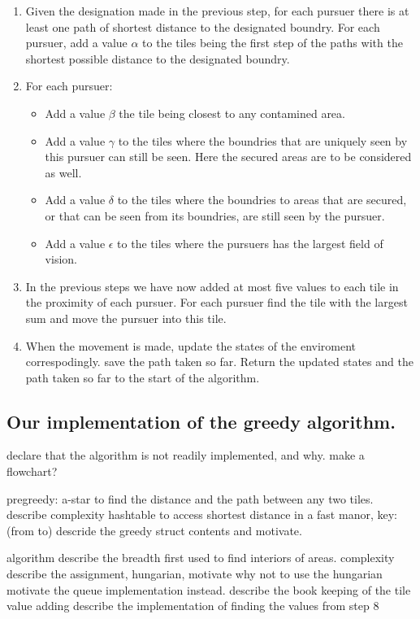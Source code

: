 \begin{enumerate}
\item{} Given the designation made in the previous step, for each pursuer there is at least one path of shortest distance to the designated boundry. For each pursuer,  add a value $\alpha$ to the tiles being the first step of the paths with the shortest possible distance to the designated boundry.
\item{} For each pursuer:
\begin{itemize}
\item{} Add a value $\beta$ the tile being closest to any contamined area. 
\item{} Add a value $\gamma$ to the tiles where the boundries that are uniquely seen by this pursuer can still be seen. Here the secured areas are to be considered as well.
\item{} Add a value $\delta$ to the tiles where the boundries to areas that are secured, or that can be seen from its boundries, are still seen by the pursuer.
\item{} Add a value $\epsilon$ to the tiles where the pursuers has the largest field of vision.
\end{itemize}
\item{} In the previous steps we have now added at most five values to each tile in the proximity of each pursuer. For each pursuer find the tile with the largest sum and move the pursuer into this tile.
\item{} When the movement is made, update the states of the enviroment correspodingly. save the path taken so far. Return the updated states and the path taken so far to the start of the algorithm. 
\end{enumerate}
\subsection{Our implementation of the greedy algorithm.}
declare that the algorithm is not readily implemented, and why. 
make a flowchart? 

pregreedy:
a-star to find the distance and the path between any two tiles. describe complexity
hashtable to access shortest distance in a fast manor, key: (from to)
descride the greedy struct contents and motivate.

algorithm
describe the breadth first used to find interiors of areas. complexity
describe the assignment, hungarian, motivate why not to use the hungarian
motivate the queue implementation instead.
describe the book keeping of the tile value adding 
describe the implementation of finding the values from step 8



